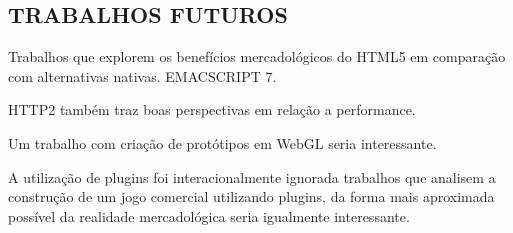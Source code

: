 \begin{draft}
\subsection{TRABALHOS FUTUROS}

Trabalhos que explorem os benefícios mercadológicos do HTML5 em comparação com alternativas nativas.
EMACSCRIPT 7.

HTTP2 também traz boas perspectivas em relação a performance.

Um trabalho com criação de protótipos em WebGL seria interessante.

A utilização de plugins foi interacionalmente ignorada trabalhos
que analisem a construção de um jogo comercial utilizando plugins,
da forma mais aproximada possível da realidade mercadológica seria
igualmente interessante.


\end{draft}

